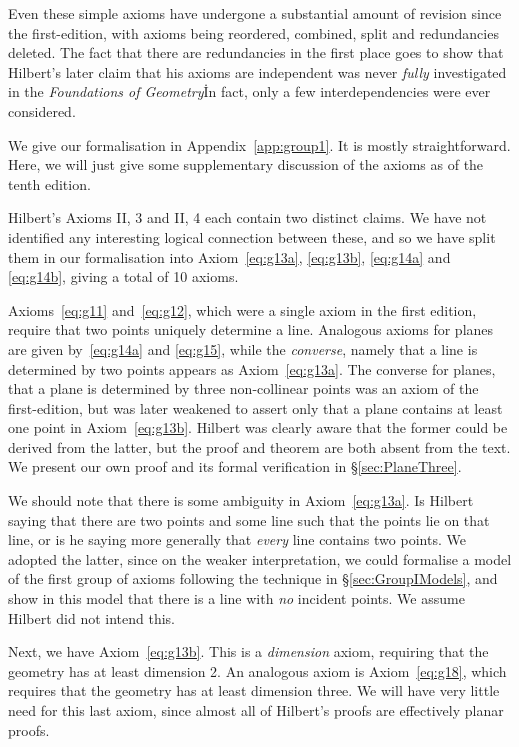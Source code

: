 Even these simple axioms have undergone a substantial amount of revision since the first-edition, with axioms being reordered, combined, split and redundancies deleted. The fact that there are redundancies in the first place goes to show that Hilbert's later claim that his axioms are independent was never \emph{fully} investigated in the \emph{Foundations of Geometry}\. In fact, only a few interdependencies were ever considered.

We give our formalisation in Appendix~\ref{app:group1}. It is mostly straightforward. Here, we will just give some supplementary discussion of the axioms as of the tenth edition.

Hilbert's Axioms II, 3 and II, 4 each contain two distinct claims. We have not identified any interesting logical connection between these, and so we have split them in our formalisation into Axiom~\ref{eq:g13a}, \ref{eq:g13b}, \ref{eq:g14a} and \ref{eq:g14b}, giving a total of 10 axioms. 

Axioms~\ref{eq:g11} and~\ref{eq:g12}, which were a single axiom in the first edition, require that two points uniquely determine a line. Analogous axioms for planes are given by~\ref{eq:g14a} and \ref{eq:g15}, while the \emph{converse}, namely that a line is determined by two points appears as Axiom~\ref{eq:g13a}. The converse for planes, that a plane is determined by three non-collinear points was an axiom of the first-edition, but was later weakened to assert only that a plane contains at least one point in Axiom~\ref{eq:g13b}. Hilbert was clearly aware that the former could be derived from the latter, but the proof and theorem are both absent from the text. We present our own proof and its formal verification in \S\ref{sec:PlaneThree}.

We should note that there is some ambiguity in Axiom~\ref{eq:g13a}. Is Hilbert saying that there are two points and some line such that the points lie on that line, or is he saying more generally that \emph{every} line contains two points. We adopted the latter, since on the weaker interpretation, we could formalise a model of the first group of axioms following the technique in \S\ref{sec:GroupIModels}, and show in this model that there is a line with \emph{no} incident points. We assume Hilbert did not intend this. 

Next, we have Axiom~\ref{eq:g13b}. This is a \emph{dimension} axiom, requiring that the geometry has at least dimension 2. An analogous axiom is Axiom~\ref{eq:g18}, which requires that the geometry has at least dimension three. We will have very little need for this last axiom, since almost all of Hilbert's proofs are effectively planar proofs.

